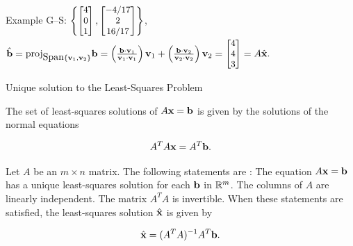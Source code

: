 \documentclass[xcolor=dvipsnames,aspectratio=169,t]{beamer}
\begin{document}
\begin{frame}{Example}
  \quad G--S: $\small \left\{ \begin{bmatrix}4 \\ 0 \\ 1 \end{bmatrix},
    \begin{bmatrix} -4/17 \\ 2 \\ 16/17 \end{bmatrix} \right\}$, \quad
  $\hat{\mathbf{b}}=\mbox{proj}_{\mbox{Span}\{\mathbf{v}_1,\mathbf{v}_2\}} \mathbf{b} 
    = \textstyle \left( \frac{\mathbf{b} \cdot \mathbf{v}_1}{\mathbf{v}_1 \cdot \mathbf{v}_1} \right) \mathbf{v}_1
    + \textstyle \left( \frac{\mathbf{b} \cdot \mathbf{v}_2}{\mathbf{v}_2 \cdot \mathbf{v}_2} \right) \mathbf{v}_2
  =\small \begin{bmatrix} 4 \\ 4 \\ 3 \end{bmatrix} = A \hat{\mathbf{x}}.
  $
  
\end{frame}


\begin{frame}{Unique solution to the Least-Squares Problem}
  \smallskip

  \begin{theorem}
  The set of least-squares solutions of $A \mathbf{x} = \mathbf{b}$ is given by the solutions of the \alert{normal equations} 
  \vspace*{-.75em}
  
  \[ A^TA \mathbf{x} = A^T \mathbf{b}.\]
  \end{theorem}
  \smallskip

  \pause
  \begin{theorem}
  Let $A$ be an $m \times n$ matrix. The following statements are :
  \bb[(a)]
  \ii The equation $A \mathbf{x} = \mathbf{b}$ has a \alert{unique} least-squares solution for each $\mathbf{b}$ in $\mathbb{R}^m$.\smallskip
  \ii The columns of $A$ are \alert{linearly independent}.\smallskip
  \ii The matrix $A^T A$ is \alert{invertible}.\smallskip
  \ee
  When these statements are satisfied, the least-squares solution $\hat{\mathbf{x}}$ is given by
  \vspace*{-.75em}
  
  \[ \hat{\mathbf{x}} = (A^TA)^{-1}A^T \mathbf{b} .\]
  \end{theorem}
\end{frame}
\end{document}
